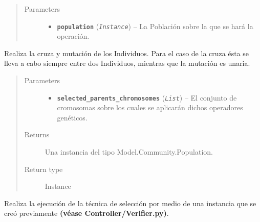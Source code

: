 \documentclass[class=report, crop=false]{standalone}
\begin{document}
\begin{fulllineitems}
\begin{fulllineitems}
\begin{quote}\begin{description}
\item[{Parameters}] \leavevmode\begin{itemize}
\item \textbf{\texttt{population}} (\emph{\texttt{Instance}}) -- La Población sobre la que se hará la operación.
\end{itemize}
\end{description}\end{quote}

\end{fulllineitems}

\begin{fulllineitems}

Realiza la cruza y mutación de los Individuos. Para el caso 
de la cruza ésta se lleva a cabo siempre entre dos Individuos, 
mientras que la mutación es unaria.

\begin{quote}\begin{description}
\item[{Parameters}] \leavevmode\begin{itemize}
\item \textbf{\texttt{selected\_parents\_chromosomes}} (\emph{\texttt{List}}) -- El conjunto de cromosomas sobre los cuales se aplicarán dichos operadores genéticos.
\end{itemize}
\item[{Returns}] \leavevmode
Una instancia del tipo Model.Community.Population.
\item[{Return type}] \leavevmode
Instance
\end{description}\end{quote}

\end{fulllineitems}

\begin{fulllineitems}

Realiza la ejecución de la técnica de selección por medio 
de una instancia que se creó previamente \textbf{(véase Controller/Verifier.py)}.


\end{fulllineitems}
\end{fulllineitems}
\end{document}
